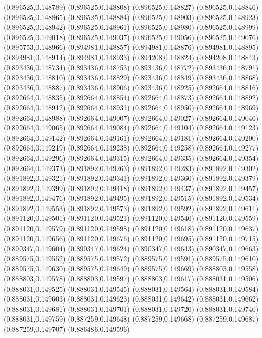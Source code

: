 (0.896525,0.148789)
(0.896525,0.148808)
(0.896525,0.148827)
(0.896525,0.148846)
(0.896525,0.148865)
(0.896525,0.148884)
(0.896525,0.148903)
(0.896525,0.148923)
(0.896525,0.148942)
(0.896525,0.148961)
(0.896525,0.148980)
(0.896525,0.148999)
(0.896525,0.149018)
(0.896525,0.149037)
(0.896525,0.149056)
(0.896525,0.149076)
(0.895753,0.148966)
(0.894981,0.148857)
(0.894981,0.148876)
(0.894981,0.148895)
(0.894981,0.148914)
(0.894981,0.148933)
(0.894208,0.148824)
(0.894208,0.148843)
(0.893436,0.148734)
(0.893436,0.148753)
(0.893436,0.148772)
(0.893436,0.148791)
(0.893436,0.148810)
(0.893436,0.148829)
(0.893436,0.148849)
(0.893436,0.148868)
(0.893436,0.148887)
(0.893436,0.148906)
(0.893436,0.148925)
(0.892664,0.148816)
(0.892664,0.148835)
(0.892664,0.148854)
(0.892664,0.148873)
(0.892664,0.148892)
(0.892664,0.148912)
(0.892664,0.148931)
(0.892664,0.148950)
(0.892664,0.148969)
(0.892664,0.148988)
(0.892664,0.149007)
(0.892664,0.149027)
(0.892664,0.149046)
(0.892664,0.149065)
(0.892664,0.149084)
(0.892664,0.149104)
(0.892664,0.149123)
(0.892664,0.149142)
(0.892664,0.149161)
(0.892664,0.149181)
(0.892664,0.149200)
(0.892664,0.149219)
(0.892664,0.149238)
(0.892664,0.149258)
(0.892664,0.149277)
(0.892664,0.149296)
(0.892664,0.149315)
(0.892664,0.149335)
(0.892664,0.149354)
(0.892664,0.149373)
(0.891892,0.149263)
(0.891892,0.149283)
(0.891892,0.149302)
(0.891892,0.149321)
(0.891892,0.149341)
(0.891892,0.149360)
(0.891892,0.149379)
(0.891892,0.149399)
(0.891892,0.149418)
(0.891892,0.149437)
(0.891892,0.149457)
(0.891892,0.149476)
(0.891892,0.149495)
(0.891892,0.149515)
(0.891892,0.149534)
(0.891892,0.149553)
(0.891892,0.149573)
(0.891892,0.149592)
(0.891892,0.149611)
(0.891120,0.149501)
(0.891120,0.149521)
(0.891120,0.149540)
(0.891120,0.149559)
(0.891120,0.149579)
(0.891120,0.149598)
(0.891120,0.149618)
(0.891120,0.149637)
(0.891120,0.149656)
(0.891120,0.149676)
(0.891120,0.149695)
(0.891120,0.149715)
(0.890347,0.149604)
(0.890347,0.149624)
(0.890347,0.149643)
(0.890347,0.149663)
(0.889575,0.149552)
(0.889575,0.149572)
(0.889575,0.149591)
(0.889575,0.149610)
(0.889575,0.149630)
(0.889575,0.149649)
(0.889575,0.149669)
(0.888803,0.149558)
(0.888803,0.149578)
(0.888803,0.149597)
(0.888803,0.149617)
(0.888031,0.149506)
(0.888031,0.149525)
(0.888031,0.149545)
(0.888031,0.149564)
(0.888031,0.149584)
(0.888031,0.149603)
(0.888031,0.149623)
(0.888031,0.149642)
(0.888031,0.149662)
(0.888031,0.149681)
(0.888031,0.149701)
(0.888031,0.149720)
(0.888031,0.149740)
(0.888031,0.149759)
(0.887259,0.149648)
(0.887259,0.149668)
(0.887259,0.149687)
(0.887259,0.149707)
(0.886486,0.149596)
